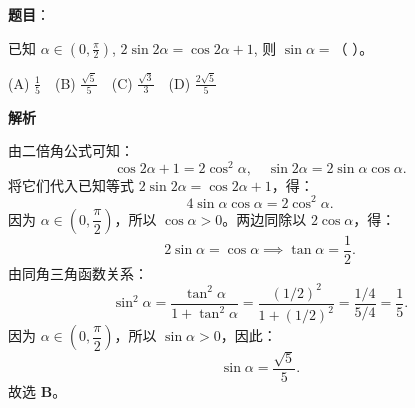 \begin{answer}

\textbf{题目}：

已知 $\alpha \in (0, \frac{\pi}{2})$, $2\sin 2\alpha = \cos 2\alpha + 1$, 则 $\sin\alpha =$（ ）。

(A) $\frac{1}{5}$　(B) $\frac{\sqrt{5}}{5}$　(C) $\frac{\sqrt{3}}{3}$　(D) $\frac{2\sqrt{5}}{5}$

\textbf{解析}

由二倍角公式可知：
\nopagebreak[4]
\[\cos 2\alpha + 1 = 2\cos^2\alpha, \quad \sin 2\alpha = 2\sin\alpha\cos\alpha.\]
将它们代入已知等式 $2\sin 2\alpha = \cos 2\alpha + 1$，得：
\nopagebreak[4]
\[4\sin\alpha\cos\alpha = 2\cos^2\alpha.\]
因为 $\alpha \in (0, \dfrac{\pi}{2})$，所以 $\cos\alpha > 0$。两边同除以 $2\cos\alpha$，得：
\nopagebreak[4]
\[2\sin\alpha = \cos\alpha \implies \tan\alpha = \frac{1}{2}.\]
由同角三角函数关系：
\nopagebreak[4]
\[\sin^2\alpha = \frac{\tan^2\alpha}{1 + \tan^2\alpha} = \frac{(1/2)^2}{1 + (1/2)^2} = \frac{1/4}{5/4} = \frac{1}{5}.\]
因为 $\alpha \in (0, \dfrac{\pi}{2})$，所以 $\sin\alpha > 0$，因此：
\nopagebreak[4]
\[\sin\alpha = \frac{\sqrt{5}}{5}.\]
故选 \textbf{B}。


\end{answer}
